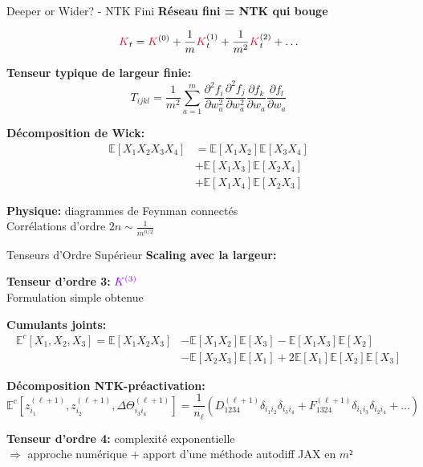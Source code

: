 \documentclass{beamer}
\newcommand{\K}{\textcolor{kernelcolor}{K}}
\begin{document}
\begin{frame}{Deeper or Wider? - NTK Fini}
\textbf{Réseau fini = NTK qui bouge}

$$\K_t = \K^{(0)} + \frac{1}{m}\K^{(1)}_t + \frac{1}{m^2}\K^{(2)}_t + \ldots$$

\textbf{Tenseur typique de largeur finie:}
\begin{equation}
T_{ijkl} = \frac{1}{m^2} \sum_{a=1}^m \frac{\partial^2 f_i}{\partial w_a^2} \frac{\partial^2 f_j}{\partial w_a^2} \frac{\partial f_k}{\partial w_a} \frac{\partial f_l}{\partial w_a}
\end{equation}

\vspace{0.3cm}

\textbf{Décomposition de Wick:}
\begin{align}
\mathbb{E}[X_1 X_2 X_3 X_4] &= \mathbb{E}[X_1 X_2]\mathbb{E}[X_3 X_4] \\
&+ \mathbb{E}[X_1 X_3]\mathbb{E}[X_2 X_4] \\
&+ \mathbb{E}[X_1 X_4]\mathbb{E}[X_2 X_3]
\end{align}

\vspace{0.3cm}

\textbf{Physique:} diagrammes de Feynman connectés\\
Corrélations d'ordre $2n \sim \frac{1}{m^{n/2}}$
\end{frame}
\begin{frame}{Tenseurs d'Ordre Supérieur}
\textbf{Scaling avec la largeur:}




\textbf{Tenseur d'ordre 3:} $\textcolor{k3color}{K^{(3)}}$\\
Formulation simple obtenue
\vspace{0.3cm}

\textbf{Cumulants joints:}
\small{
\begin{align*}
\mathbb{E}^c[X_1, X_2, X_3] = \mathbb{E}[X_1 X_2 X_3] &- \mathbb{E}[X_1 X_2]\mathbb{E}[X_3] - \mathbb{E}[X_1 X_3]\mathbb{E}[X_2] \\
&- \mathbb{E}[X_2 X_3]\mathbb{E}[X_1] + 2\mathbb{E}[X_1]\mathbb{E}[X_2]\mathbb{E}[X_3]
\end{align*}
}

\vspace{0.2cm}

\textbf{Décomposition NTK-préactivation:}
\small{
\begin{equation*}
\mathbb{E}^c[z_{i_1}^{(\ell+1)}, z_{i_2}^{(\ell+1)}, \Delta\Theta_{i_3 i_4}^{(\ell+1)}] = \frac{1}{n_\ell} \left( D_{1234}^{(\ell+1)} \delta_{i_1 i_2}\delta_{i_3 i_4} + F_{1324}^{(\ell+1)} \delta_{i_1 i_3}\delta_{i_2 i_4} + \dots \right)
\end{equation*}
}

\vspace{0.5cm}
\textbf{Tenseur d'ordre 4:} complexité exponentielle\\
$\Rightarrow$ approche numérique + apport d'une méthode autodiff JAX en $m²$
\end{frame}
\end{document}
